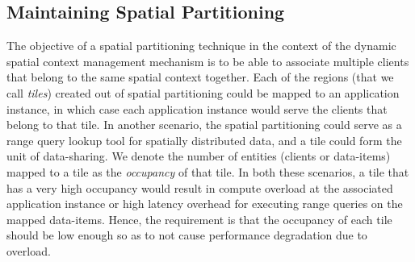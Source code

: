 \subsection{Maintaining Spatial Partitioning}
The objective of a spatial partitioning technique in the context of the dynamic spatial context management mechanism is to be able to associate multiple clients that belong to the same spatial context together. Each of the regions (that we call \textit{tiles}) created out of spatial partitioning could be mapped to an application instance, in which case each application instance would serve the clients that belong to that tile. In another scenario, the spatial partitioning could serve as a range query lookup tool for spatially distributed data, and a tile could form the unit of data-sharing. We denote the number of entities (clients or data-items) mapped to a tile as the \textit{occupancy} of that tile. In both these scenarios, a tile that has a very high occupancy would result in compute overload at the associated application instance or high latency overhead for executing range queries on the mapped data-items. Hence, the requirement is that the occupancy of each tile should be low enough so as to not cause performance degradation due to overload. 
